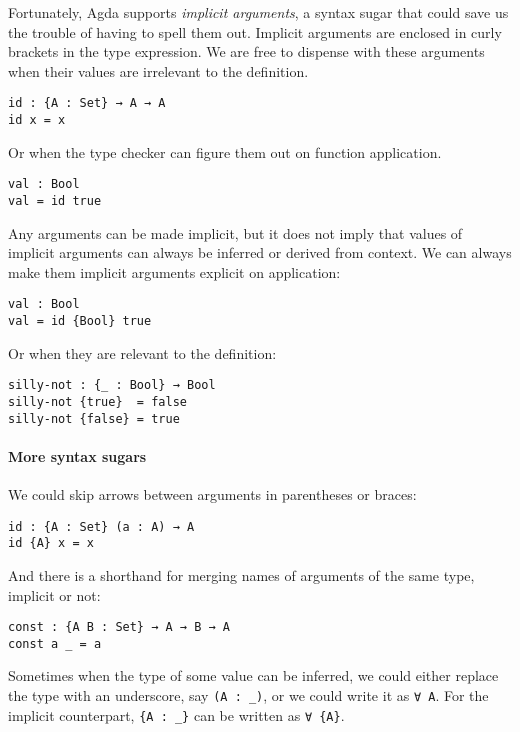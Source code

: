 \documentclass[../thesis.tex]{subfiles}
\begin{document}
Fortunately, Agda supports \textit{implicit arguments}, a syntax sugar that could
save us the trouble of having to spell them out. Implicit arguments are enclosed
in curly brackets in the type expression. We are free to dispense with these arguments
when their values are irrelevant to the definition.

\begin{lstlisting}
id : {A : Set} → A → A
id x = x
\end{lstlisting}

Or when the type checker can figure them out on function application.

\begin{lstlisting}
val : Bool
val = id true
\end{lstlisting}

Any arguments can be made implicit, but it does not imply that values of
implicit arguments can always be inferred or derived from context. We can always
make them implicit arguments explicit on application:

\begin{lstlisting}
val : Bool
val = id {Bool} true
\end{lstlisting}

Or when they are relevant to the definition:

\begin{lstlisting}
silly-not : {_ : Bool} → Bool
silly-not {true}  = false
silly-not {false} = true
\end{lstlisting}

\paragraph{More syntax sugars}
We could skip arrows between arguments in parentheses or braces:

\begin{lstlisting}
id : {A : Set} (a : A) → A
id {A} x = x
\end{lstlisting}

And there is a shorthand for merging names of arguments of the same type, implicit or not:

\begin{lstlisting}
const : {A B : Set} → A → B → A
const a _ = a
\end{lstlisting}

Sometimes when the type of some value can be inferred, we could either replace
the type with an underscore, say {\lstinline|(A : _)|}, or we could write it as
{\lstinline|∀ A|}. For the implicit counterpart, {\lstinline|{A : _}|} can be
written as {\lstinline|∀ {A}|}.
\end{document}
